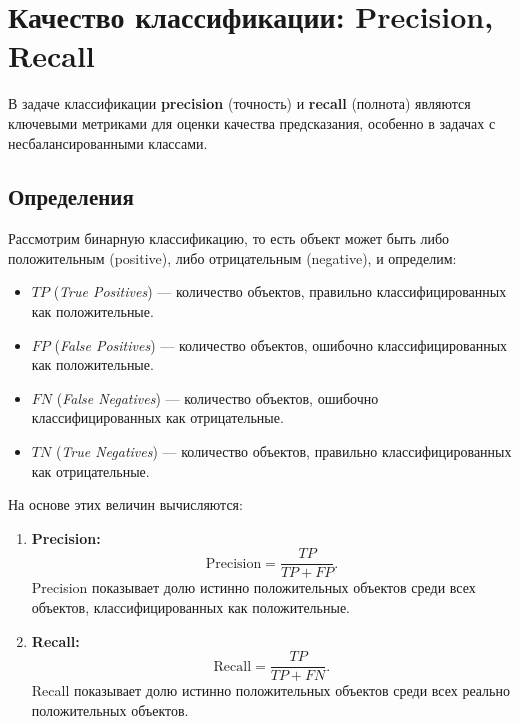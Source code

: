 \section*{Качество классификации: Precision, Recall}

В задаче классификации \textbf{precision} (точность) и \textbf{recall} (полнота) являются ключевыми метриками для оценки качества предсказания, особенно в задачах с несбалансированными классами.

\subsection*{Определения}

Рассмотрим бинарную классификацию, то есть объект может быть либо положительным (positive), либо отрицательным (negative), и определим:

\begin{itemize}
    \item $TP$ (\textit{True Positives}) — количество объектов, правильно классифицированных как положительные.
    \item $FP$ (\textit{False Positives}) — количество объектов, ошибочно классифицированных как положительные.
    \item $FN$ (\textit{False Negatives}) — количество объектов, ошибочно классифицированных как отрицательные.
    \item $TN$ (\textit{True Negatives}) — количество объектов, правильно классифицированных как отрицательные.
\end{itemize}

На основе этих величин вычисляются:

\begin{enumerate}
    \item \textbf{Precision:}
    \[
    \text{Precision} = \frac{TP}{TP + FP}.
    \]
    Precision показывает долю истинно положительных объектов среди всех объектов, классифицированных как положительные.

    \item \textbf{Recall:}
    \[
    \text{Recall} = \frac{TP}{TP + FN}.
    \]
    Recall показывает долю истинно положительных объектов среди всех реально положительных объектов.
\end{enumerate}

